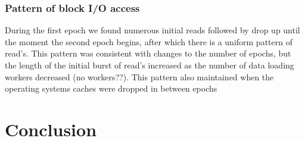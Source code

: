 \documentclass[conference]{IEEEtran}
\begin{document}
\subsubsection{Pattern of block I/O access}
During the first epoch we found numerous initial reads followed by drop up until the moment the second epoch begins, after which there is a uniform pattern of read's.
This pattern was consistent with changes to the number of epochs, but the length of the initial burst of read's increased as the number of data loading workers decreased (no workers??).
This pattern also maintained when the operating systems caches were dropped in between epochs

\section{Conclusion}


\end{document}
